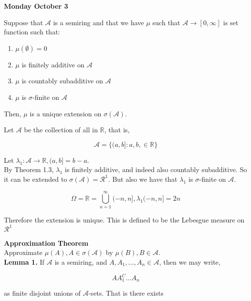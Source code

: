 \documentclass[11pt,fleqn]{book} %
\begin{document}
\textbf{Monday October 3}\\

\begin{corollary}[To Theorem 11.1 \& 11.3]
	Suppose that $\mathcal{A}$ is a semiring and that we have $\mu$ such that $\mathcal{A} \rightarrow [0, \infty]$ is set function such that:

		\begin{enumerate}
			\item  $\mu(\emptyset) = 0$
			\item $\mu$ is finitely additive on $\mathcal{A}$
			\item $\mu$ is countably subadditive on $\mathcal{A}$
			\item $\mu$ is $\sigma$-finite on $\mathcal{A}$
		\end{enumerate}

Then, $\mu$ is a unique extension on $\sigma(\mathcal{A})$.
\end{corollary}


\begin{example}
	Let $\mathcal{A}$ be the collection of all  in $\mathbb{R}$, that is, 

			$$\mathcal{A} = \{(a,b]: a, b, \in \mathbb{R} \} $$ 

	Let $\lambda_1: \mathcal{A} \rightarrow \mathbb{R}, (a,b] = b - a$.\\

	By Theorem 1.3, $\lambda_1$ is finitely additive, and indeed also countably subadditive. So it can be extended to $\sigma(\mathcal{A}) = \mathcal{R}^1$. But also we have that $\lambda_1$ is $\sigma$-finite on $\mathcal{A}$.

			$$\Omega = \mathbb{R} = \bigcup^\infty_{n=1} (-n, n], \lambda_1(-n, n] = 2n $$

	Therefore the extension is unique. This is defined to be the Lebesgue measure on $\mathcal{R}^1$
\end{example}

\textbf{Approximation Theorem}\\

Approximate $\mu(A), A \in \sigma(\mathcal{A})$ by $\mu(B), B \in \mathcal{A}$.\\

\textbf{Lemma 1.} If $\mathcal{A}$ is a semiring, and $A, A_1, \dots, A_n \in \mathcal{A}$, then we may write, 

		$$A A_1^C \dots A_n $$

as finite disjoint unions of $\mathcal{A}$-sets. That is there exists
\end{document}
